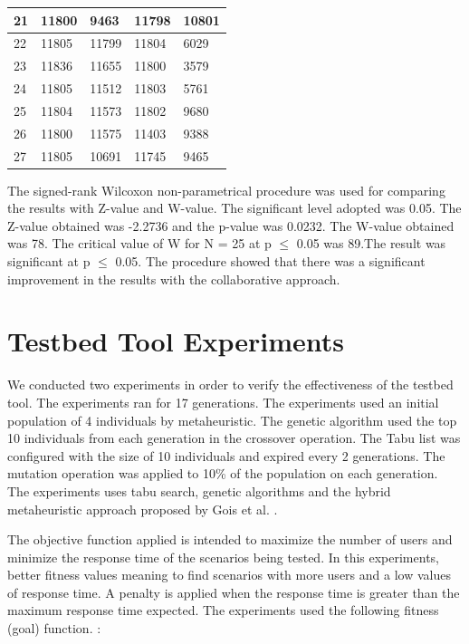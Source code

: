 \begin{table}[h]
\begin{tabular}{|l|l|l|l|l|}
21         & 11800 & 9463          & 11798 & 10801 \\ \hline
22         & 11805 & 11799         & 11804 & 6029  \\ \hline
23         & 11836 & 11655         & 11800 & 3579  \\ \hline
24         & 11805 & 11512         & 11803 & 5761  \\ \hline
25         & 11804 & 11573         & 11802 & 9680  \\ \hline
26         & 11800 & 11575         & 11403 & 9388  \\ \hline
27         & 11805 & 10691         & 11745 & 9465  \\ \hline
\end{tabular}
\end{table}

The signed-rank Wilcoxon non-parametrical procedure was used for comparing the results with Z-value and W-value. The significant level adopted was 0.05. The Z-value obtained was -2.2736 and the p-value was 0.0232. The W-value obtained was 78. The critical value of W for N = 25 at p $\leq$ 0.05 was 89.The result was significant at p $\leq$ 0.05. The procedure showed that there was a significant improvement in the results with the collaborative approach.

\section{Testbed Tool Experiments}

We conducted two experiments in order to verify the effectiveness of the testbed tool. The experiments ran for 17 generations. The experiments used an initial population of 4 individuals by metaheuristic. The genetic algorithm used the top 10 individuals from each generation in the crossover operation. The Tabu list was configured with the size of 10 individuals and expired every 2 generations.  The mutation operation was applied to 10\% of the population on each generation. The experiments uses tabu search, genetic algorithms and the hybrid metaheuristic approach proposed by Gois et al. \cite{Gois2016}. 


The objective function applied is intended to maximize the number of users and minimize the response time of the scenarios being tested.  In this experiments, better fitness values meaning to find scenarios with more users and a low values of response time. A penalty is applied when the response time is greater than the  maximum response time expected. The experiments used the following fitness (goal) function. :

